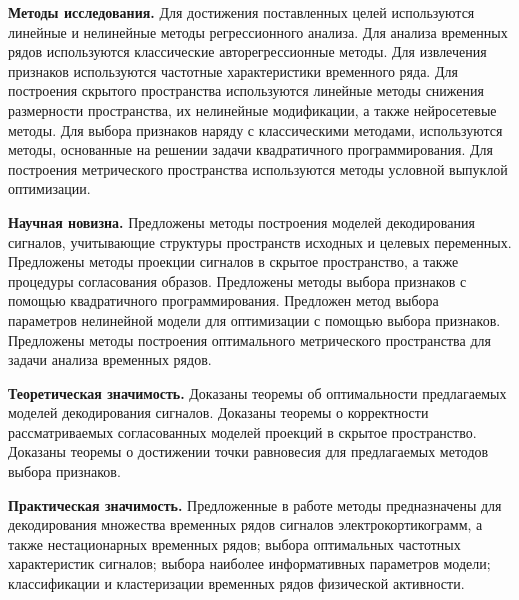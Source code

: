 \vspace{0.5cm}
\textbf{Методы исследования.}
Для достижения поставленных целей используются линейные и нелинейные методы регрессионного анализа.
Для анализа временных рядов используются классические авторегрессионные методы.
Для извлечения признаков используются частотные характеристики временного ряда.
Для построения скрытого пространства используются линейные методы снижения размерности пространства, их нелинейные модификации, а также нейросетевые методы.
Для выбора признаков наряду с классическими методами, используются методы, основанные на решении задачи квадратичного программирования.
Для построения метрического пространства используются методы условной выпуклой оптимизации.

\vspace{0.5cm}
\textbf{Научная новизна.}
Предложены методы построения моделей декодирования сигналов, учитывающие структуры пространств исходных и целевых переменных.
Предложены методы проекции сигналов в скрытое пространство, а также процедуры согласования образов.
Предложены методы выбора признаков с помощью квадратичного программирования.
Предложен метод выбора параметров нелинейной модели для оптимизации с помощью выбора признаков.
Предложены методы построения оптимального метрического пространства для задачи анализа временных рядов.

\vspace{0.5cm}
\textbf{Теоретическая значимость.}
Доказаны теоремы об оптимальности предлагаемых моделей декодирования сигналов.
Доказаны теоремы о корректности рассматриваемых согласованных моделей проекций в скрытое пространство.
Доказаны теоремы о достижении точки равновесия для предлагаемых методов выбора признаков. 

\vspace{0.5cm}
\textbf{Практическая значимость.}
Предложенные в работе методы предназначены для декодирования множества временных рядов сигналов электрокортикограмм, а также нестационарных временных рядов; выбора оптимальных частотных характеристик сигналов; выбора наиболее информативных параметров модели; классификации и кластеризации временных рядов физической активности.

